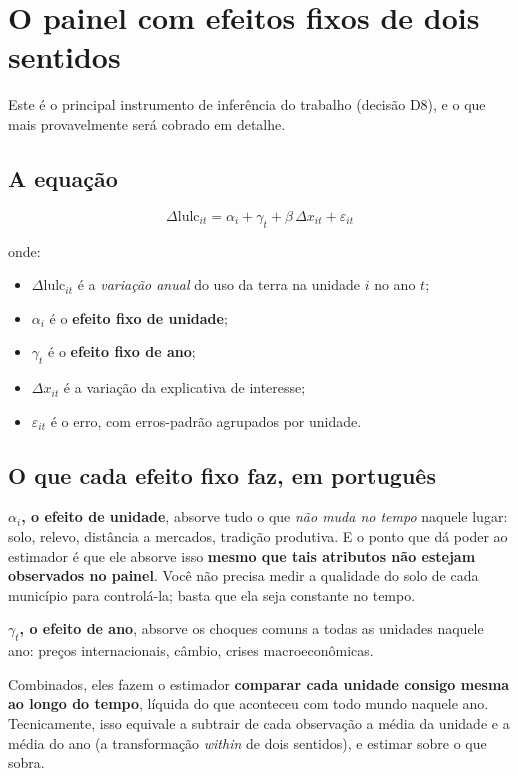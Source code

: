 \chapter{O painel com efeitos fixos de dois sentidos}
\label{cap:painel}

Este é o principal instrumento de inferência do trabalho (decisão D8), e o que
mais provavelmente será cobrado em detalhe.

\section{A equação}

\begin{equation}
\Delta \mathrm{lulc}_{it} = \alpha_i + \gamma_t + \beta \, \Delta x_{it} + \varepsilon_{it}
\label{eq:2fe}
\end{equation}

onde:
\begin{itemize}
\item $\Delta \mathrm{lulc}_{it}$ é a \emph{variação anual} do uso da terra na
unidade $i$ no ano $t$;
\item $\alpha_i$ é o \textbf{efeito fixo de unidade};
\item $\gamma_t$ é o \textbf{efeito fixo de ano};
\item $\Delta x_{it}$ é a variação da explicativa de interesse;
\item $\varepsilon_{it}$ é o erro, com erros-padrão agrupados por unidade.
\end{itemize}

\section{O que cada efeito fixo faz, em português}

\textbf{$\alpha_i$, o efeito de unidade}, absorve tudo o que \emph{não muda no
tempo} naquele lugar: solo, relevo, distância a mercados, tradição produtiva.
E o ponto que dá poder ao estimador é que ele absorve isso \textbf{mesmo que
tais atributos não estejam observados no painel}. Você não precisa medir a
qualidade do solo de cada município para controlá-la; basta que ela seja
constante no tempo.

\textbf{$\gamma_t$, o efeito de ano}, absorve os choques comuns a todas as
unidades naquele ano: preços internacionais, câmbio, crises macroeconômicas.

Combinados, eles fazem o estimador \textbf{comparar cada unidade consigo mesma
ao longo do tempo}, líquida do que aconteceu com todo mundo naquele ano.
Tecnicamente, isso equivale a subtrair de cada observação a média da unidade e a
média do ano (a transformação \emph{within} de dois sentidos), e estimar sobre o
que sobra.

